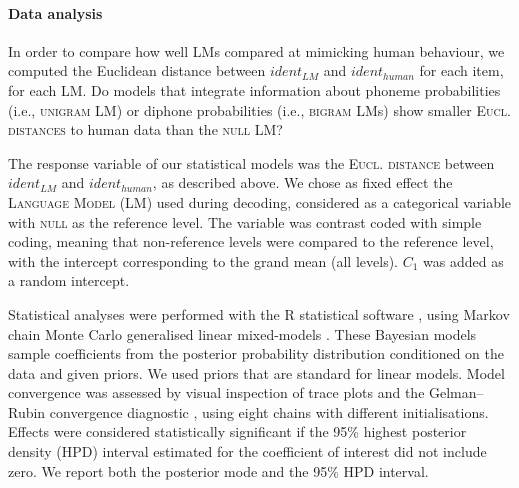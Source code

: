 \paragraph{Data analysis}
In order to compare how well LMs compared at mimicking human behaviour, we computed the Euclidean distance between $ident_{LM}$ and $ident_{human}$ for each item, for each LM. Do models that integrate information about phoneme probabilities (i.e., \textsc{unigram} LM) or diphone probabilities (i.e., \textsc{bigram} LMs) show smaller \textsc{Eucl. distances} to human data than the \textsc{null} LM?

The response variable of our statistical models was the \textsc{Eucl. distance} between $ident_{LM}$ and $ident_{human}$, as described above.  
We chose as fixed effect the \textsc{Language Model} (\textsc{LM}) used during decoding, considered as a categorical variable with \textsc{null} as the reference level. The variable was contrast coded with simple coding, meaning that non-reference levels were compared to the reference level, with the intercept corresponding to the grand mean (all levels).
\textsc{$C_{1}$} was added as a random intercept.

Statistical analyses were performed with the R statistical software \cite{R-base}, using Markov chain Monte Carlo generalised linear mixed-models \cite{R-MCMCglmm, R-coda}. These Bayesian models sample coefficients from the posterior probability distribution conditioned on the data and given priors. We used priors that are standard for linear models. Model convergence was assessed by visual inspection of trace plots and the Gelman–Rubin convergence diagnostic \cite{gelman1992}, using eight chains with different initialisations. Effects were considered statistically significant if the 95\% highest posterior density (HPD) interval estimated for the coefficient of interest did not include zero. We report both the posterior mode and the 95\% HPD interval.  


